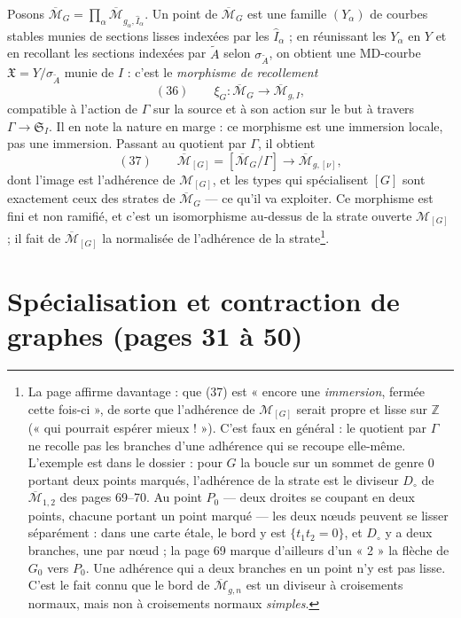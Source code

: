 \documentclass[11pt,a4paper]{article}
\begin{document}
Posons $\overline{\mathcal{M}}_G = \prod_\alpha
\overline{\mathcal{M}}_{g_\alpha, \widehat{I}_\alpha}$. Un point de
$\overline{\mathcal{M}}_G$ est une famille $(Y_\alpha)$ de courbes stables munies
de sections lisses indexées par les $\widehat{I}_\alpha$ ; en réunissant les
$Y_\alpha$ en $Y$ et en recollant les sections indexées par $\widetilde{A}$
selon $\sigma_{\widetilde{A}}$, on obtient une MD-courbe $\mathfrak{X} =
Y/\sigma_{\widetilde{A}}$ munie de $I$ : c'est le \emph{morphisme de recollement}
\[
(36) \qquad \xi_G : \overline{\mathcal{M}}_G \longrightarrow
\overline{\mathcal{M}}_{g,I},
\]
compatible à l'action de $\Gamma$ sur la source et à son action sur le but à
travers $\Gamma \to \mathfrak{S}_I$. Il en note la nature en marge : ce
morphisme est une immersion locale, pas une immersion. Passant au quotient par
$\Gamma$, il obtient
\[
(37) \qquad \overline{\mathcal{M}}_{[G]} = [\overline{\mathcal{M}}_G/\Gamma]
\longrightarrow \overline{\mathcal{M}}_{g,[\nu]},
\]
dont l'image est l'adhérence de $\mathcal{M}_{[G]}$, et les types qui
spécialisent $[G]$ sont exactement ceux des strates de $\overline{\mathcal{M}}_G$
— ce qu'il va exploiter. Ce morphisme est fini et non ramifié, et c'est un
isomorphisme au-dessus de la strate ouverte $\mathcal{M}_{[G]}$ ; il fait de
$\overline{\mathcal{M}}_{[G]}$ la normalisée de l'adhérence de la
strate\footnote{La page affirme davantage : que (37) est « encore une
\emph{immersion}, fermée cette fois-ci », de sorte que l'adhérence de
$\mathcal{M}_{[G]}$ serait propre et lisse sur $\mathbb{Z}$ (« qui pourrait
espérer mieux ! »). C'est faux en général : le quotient par $\Gamma$ ne recolle
pas les branches d'une adhérence qui se recoupe elle-même. L'exemple est dans le
dossier : pour $G$ la boucle sur un sommet de genre $0$ portant deux points
marqués, l'adhérence de la strate est le diviseur $D_\circ$ de
$\overline{\mathcal{M}}_{1,2}$ des pages 69--70. Au point $P_0$ — deux droites
se coupant en deux points, chacune portant un point marqué — les deux nœuds
peuvent se lisser séparément : dans une carte étale, le bord y est $\{t_1 t_2 =
0\}$, et $D_\circ$ y a deux branches, une par nœud ; la page 69 marque d'ailleurs
d'un « 2 » la flèche de $G_0$ vers $P_0$. Une adhérence qui a deux branches en un
point n'y est pas lisse. C'est le fait connu que le bord de $\overline{\mathcal{M}}_{g,n}$ est
un diviseur à croisements normaux, mais non à croisements normaux
\emph{simples}.}.

\section*{Spécialisation et contraction de graphes (pages 31 à 50)}
\end{document}
